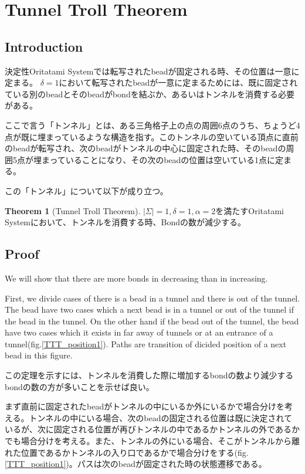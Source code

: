 \documentclass[a4,dvipdfmx,11pt]{article}
\theoremstyle{definition}
\newtheorem{myth}{Theorem}[section]
\begin{document}
\section{Tunnel Troll Theorem}
\subsection{Introduction}
決定性Oritatami Systemでは転写されたbeadが固定される時、その位置は一意に定まる。
$\delta = 1$において転写されたbeadが一意に定まるためには、既に固定されている別のbeadとそのbeadがbondを結ぶか、あるいはトンネルを消費する必要がある。

ここで言う「トンネル」とは、ある三角格子上の点の周囲6点のうち、ちょうど4点が既に埋まっているような構造を指す。このトンネルの空いている頂点に直前のbeadが転写され、次のbeadがトンネルの中心に固定された時、そのbeadの周囲5点が埋まっていることになり、その次のbeadの位置は空いている1点に定まる。


この「トンネル」について以下が成り立つ。

\begin{myth}[Tunnel Troll Theorem]
  $|\Sigma| = 1, \delta = 1, \alpha = 2$を満たすOritatami Systemにおいて、トンネルを消費する時、Bondの数が減少する。
\end{myth}

\subsection{Proof}

We will show that there are more bonds in decreasing than in increasing.


First, we divide cases of there is a bead in a tunnel and there is out of the tunnel.
The bead have two cases which a next bead is in a tunnel or out of the tunnel if the bead in the tunnel. On the other hand if the bead out of the tunnel, the bead have two cases which it exists in far away of tunnels or at an entrance of a tunnel(fig.\ref{TTT_position1}). Paths are transition of dicided position of a next bead in this figure.

この定理を示すには、トンネルを消費した際に増加するbondの数より減少するbondの数の方が多いことを示せば良い。


まず直前に固定されたbeadがトンネルの中にいるか外にいるかで場合分けを考える。トンネルの中にいる場合、次のbeadの固定される位置は既に決定されているが、次に固定される位置が再びトンネルの中であるかトンネルの外であるかでも場合分けを考える。また、トンネルの外にいる場合、そこがトンネルから離れた位置であるかトンネルの入り口であるかで場合分けをする(fig.\ref{TTT_position1})。パスは次のbeadが固定された時の状態遷移である。
\end{document}
